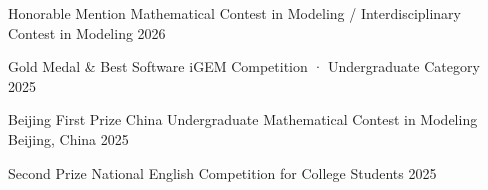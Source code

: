 
\begin{cvhonors}

  \cvhonor
    {Honorable Mention}
    {Mathematical Contest in Modeling / Interdisciplinary Contest in Modeling}
    {}
    {2026}

  \cvhonor
    {Gold Medal \& Best Software}
    {iGEM Competition · Undergraduate Category}
    {}
    {2025}

  \cvhonor
    {Beijing First Prize}
    {China Undergraduate Mathematical Contest in Modeling}
    {Beijing, China}
    {2025}


  \cvhonor
    {Second Prize}
    {National English Competition for College Students}
    {}
    {2025}
\end{cvhonors}
